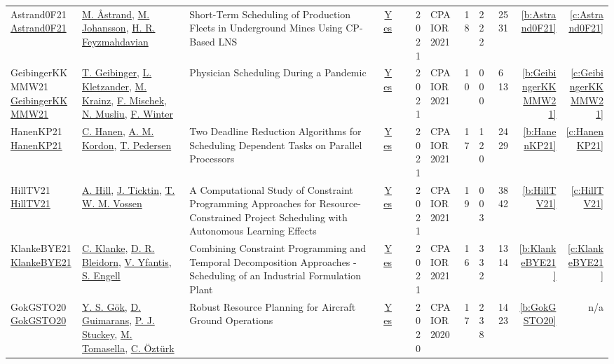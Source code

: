 {\begin{longtable}{>{\raggedright\arraybackslash}p{3cm}>{\raggedright\arraybackslash}p{4.5cm}>{\raggedright\arraybackslash}p{6.0cm}rrrp{2.5cm}rp{1cm}p{1cm}rr}
Astrand0F21 \href{https://doi.org/10.1007/978-3-030-78230-6_23}{Astrand0F21} & \hyperref[auth:a74]{M. {\AA}strand}, \hyperref[auth:a75]{M. Johansson}, \hyperref[auth:a76]{H. R. Feyzmahdavian} & Short-Term Scheduling of Production Fleets in Underground Mines Using CP-Based {LNS} & \href{../works/Astrand0F21.pdf}{Yes} & \cite{Astrand0F21} & 2021 & CPAIOR 2021 & 18 & 2 2 2 & 25 31 & \ref{b:Astrand0F21} & \ref{c:Astrand0F21}\\
GeibingerKKMMW21 \href{https://doi.org/10.1007/978-3-030-78230-6_29}{GeibingerKKMMW21} & \hyperref[auth:a77]{T. Geibinger}, \hyperref[auth:a78]{L. Kletzander}, \hyperref[auth:a79]{M. Krainz}, \hyperref[auth:a80]{F. Mischek}, \hyperref[auth:a45]{N. Musliu}, \hyperref[auth:a43]{F. Winter} & Physician Scheduling During a Pandemic & \href{../works/GeibingerKKMMW21.pdf}{Yes} & \cite{GeibingerKKMMW21} & 2021 & CPAIOR 2021 & 10 & 0 0 0 & 6 13 & \ref{b:GeibingerKKMMW21} & \ref{c:GeibingerKKMMW21}\\
HanenKP21 \href{https://doi.org/10.1007/978-3-030-78230-6_14}{HanenKP21} & \hyperref[auth:a71]{C. Hanen}, \hyperref[auth:a72]{A. M. Kordon}, \hyperref[auth:a73]{T. Pedersen} & Two Deadline Reduction Algorithms for Scheduling Dependent Tasks on Parallel Processors & \href{../works/HanenKP21.pdf}{Yes} & \cite{HanenKP21} & 2021 & CPAIOR 2021 & 17 & 1 2 0 & 24 29 & \ref{b:HanenKP21} & \ref{c:HanenKP21}\\
HillTV21 \href{https://doi.org/10.1007/978-3-030-78230-6_2}{HillTV21} & \hyperref[auth:a64]{A. Hill}, \hyperref[auth:a65]{J. Ticktin}, \hyperref[auth:a66]{T. W. M. Vossen} & A Computational Study of Constraint Programming Approaches for Resource-Constrained Project Scheduling with Autonomous Learning Effects & \href{../works/HillTV21.pdf}{Yes} & \cite{HillTV21} & 2021 & CPAIOR 2021 & 19 & 0 0 3 & 38 42 & \ref{b:HillTV21} & \ref{c:HillTV21}\\
KlankeBYE21 \href{https://doi.org/10.1007/978-3-030-78230-6_9}{KlankeBYE21} & \hyperref[auth:a67]{C. Klanke}, \hyperref[auth:a68]{D. R. Bleidorn}, \hyperref[auth:a69]{V. Yfantis}, \hyperref[auth:a70]{S. Engell} & Combining Constraint Programming and Temporal Decomposition Approaches - Scheduling of an Industrial Formulation Plant & \href{../works/KlankeBYE21.pdf}{Yes} & \cite{KlankeBYE21} & 2021 & CPAIOR 2021 & 16 & 3 3 2 & 13 14 & \ref{b:KlankeBYE21} & \ref{c:KlankeBYE21}\\
GokGSTO20 \href{https://doi.org/10.1007/978-3-030-58942-4_15}{GokGSTO20} & \hyperref[auth:a1015]{Y. S. G\"{o}k}, \hyperref[auth:a1013]{D. Guimarans}, \hyperref[auth:a125]{P. J. Stuckey}, \hyperref[auth:a1012]{M. Tomasella}, \hyperref[auth:a135]{C. {\"{O}}zt{\"{u}}rk} & Robust Resource Planning for Aircraft Ground Operations & \href{../works/GokGSTO20.pdf}{Yes} & \cite{GokGSTO20} & 2020 & CPAIOR 2020 & 17 & 2 3 8 & 14 23 & \ref{b:GokGSTO20} & n/a\\

\end{longtable}}
